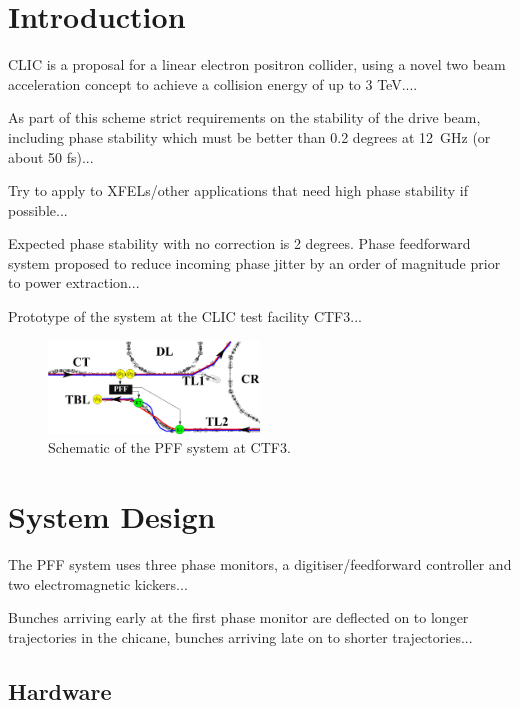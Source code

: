 \documentclass[%
 reprint,
 amsmath,amssymb,
 aps,
]{revtex4-1}
\begin{document}

\section{\label{s:intro}Introduction}

CLIC is a proposal for a linear electron positron collider, using a novel two beam acceleration concept to achieve a collision energy of up to 3 TeV....

As part of this scheme strict requirements on the stability of the drive beam, including phase stability which must be better than 0.2 degrees at 12~GHz (or about 50 fs)...

Try to apply to XFELs/other applications that need high phase stability if possible...

Expected phase stability with no correction is 2 degrees. Phase feedforward system proposed to reduce incoming phase jitter by an order of magnitude prior to power extraction...

Prototype of the system at the CLIC test facility CTF3...

\begin{figure}
\includegraphics[width=0.5\textwidth]{figs/ctfpffLayout}%
\caption{\label{fig:pffLayout}Schematic of the PFF system at CTF3.}
\end{figure}

\section{\label{s:ctfLayout}System Design}

The PFF system uses three phase monitors, a digitiser/feedforward controller and two electromagnetic kickers...

Bunches arriving early at the first phase monitor are deflected on to longer trajectories in the chicane, bunches arriving late on to shorter trajectories...

\subsection{\label{ss:hardware}Hardware}
\end{document}
